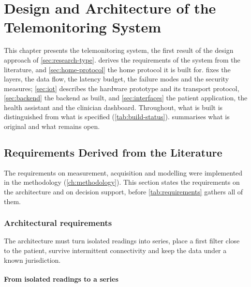 \chapter{Design and Architecture of the Telemonitoring System}\label{ch:architecture}\label{ch:design}

This chapter presents the telemonitoring system, the first result of the design approach of \cref{sec:research-type}.  derives the requirements of the system from the literature, and \cref{sec:home-protocol} the home protocol it is built for.  fixes the layers, the data flow, the latency budget, the failure modes and the security measures; \cref{sec:iot} describes the hardware prototype and its transport protocol, \cref{sec:backend} the backend as built, and \cref{sec:interfaces} the patient application, the health assistant and the clinician dashboard. Throughout, what is built is distinguished from what is specified (\cref{tab:build-status}).  summarises what is original and what remains open.

\section{Requirements Derived from the Literature}\label{ch:techsota}\label{sec:design-req}

The requirements on measurement, acquisition and modelling were implemented in the methodology (\cref{ch:methodology}). This section states the requirements on the architecture and on decision support, before \cref{tab:requirements} gathers all of them.

\subsection{Architectural requirements}\label{sec:cloud}

The architecture must turn isolated readings into series, place a first filter close to the patient, survive intermittent connectivity and keep the data under a known jurisdiction.

\subsubsection{From isolated readings to a series}\label{sec:act-series}\label{sec:hearts-spec}

